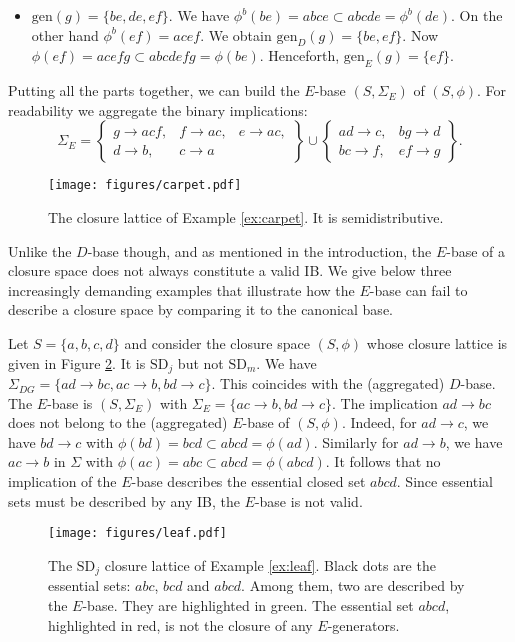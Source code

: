 \documentclass[12pt, a4paper]{article}
\def\FIGcarpet{1.05}  %
\def\FIGleaf{1.05}  %
\newcommand{\U}{S}  %
\newcommand{\SDj}{\mathrm{SD}_j}  %
\newcommand{\SDm}{\mathrm{SD}_m}  %
\newcommand{\cl}{\phi}  %
\newcommand{\gen}{\mathrm{gen}}  %
\newcommand{\imp}{\rightarrow}  %
\newcommand{\is}{\Sigma}  %
\begin{document}
\begin{example}
\begin{itemize}
    \item $\gen(g) = \{be, de, e\!f\}$.
    We have $\cl^b(be) = abce \subset abcde =\cl^b(de)$. 
    On the other hand $\cl^b(e\!f) = ace\!f$.
    We obtain $\gen_D(g) = \{be, e\!f\}$.
    Now $\cl(e\!f) = ace\!f\!g \subset abcde\!f\!g = \cl(be)$.
    Henceforth, $\gen_E(g) = \{e\!f\}$.
\end{itemize}
Putting all the parts together, we can build the $E$-base $(\U, \is_E)$ of $(\U, \cl)$.
For readability we aggregate the binary implications:
%
\[ 
\is_E = \left\{ 
\begin{array}{lll}
g \imp ac\!f, & f \imp ac, & e \imp ac, \\
d \imp b, & c \imp a & 
\end{array}\right\} \cup \left\{
\begin{array}{ll}
ad \imp c, & bg \imp d \\
bc \imp f, & e\!f \imp g
\end{array}\right\}.
\] 
%
\begin{figure}[ht!]
    \centering
    \texttt{[image: figures/carpet.pdf]}
    \caption{The closure lattice of Example \ref{ex:carpet}. It is semidistributive.}
    \label{fig:carpet}
\end{figure}

\end{example}
%
Unlike the $D$-base though, and as mentioned in the introduction, the $E$-base of a closure space does not always constitute a valid IB.
We give below three increasingly demanding examples that illustrate how the $E$-base can fail to describe a closure space by comparing it to the canonical base. 

\begin{example} \label{ex:leaf}
Let $\U = \{a, b, c, d\}$ and consider the closure space $(\U, \cl)$ whose closure lattice is given in Figure \ref{fig:leaf}.
It is $\SDj$ but not $\SDm$.
We have $\is_{DG} = \{ad \imp bc, ac \imp b, bd \imp c\}$.
This coincides with the (aggregated) $D$-base.
The $E$-base is $(\U, \is_E)$ with $\is_E = \{ac \imp b, bd \imp c\}$. 
The implication $ad \imp bc$ does not belong to the (aggregated) $E$-base of $(\U, \cl)$.
Indeed, for $ad \imp c$, we have $bd \imp c$ with $\cl(bd) = bcd \subset abcd = \cl(ad)$.
Similarly for $ad \imp b$, we have $ac \imp b$ in $\is$ with $\cl(ac) = abc \subset abcd = \cl(abcd)$.
It follows that no implication of the $E$-base describes the essential closed set $abcd$.
Since essential sets must be described by any IB, the $E$-base is not valid.
%
\begin{figure}[ht!]
    \centering
    \texttt{[image: figures/leaf.pdf]}
    \caption{The $\SDj$ closure lattice of Example \ref{ex:leaf}. Black dots are the essential sets: $abc$, $bcd$ and $abcd$. 
    Among them, two are described by the $E$-base. 
    They are highlighted in green.
    The essential set $abcd$, highlighted in red, is not the closure of any $E$-generators.}
    \label{fig:leaf}
\end{figure}
%
\end{example}
\end{document}
